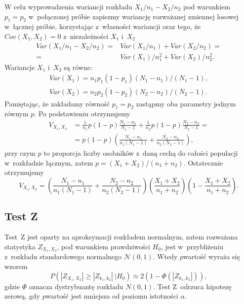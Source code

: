 W celu wyprowadzenia wariancji rozkładu $X_1/n_1-X_2/n_2$ pod warunkiem $p_1=p_2$ w~połączonej próbie zapiszmy wariancję rozważanej zmiennej losowej w~łącznej próbie, korzystając z~własności wariancji oraz tego, że $Cov(X_1,X_2)=0$ z~niezależności $X_1$ i~$X_2$
\begin{equation}
\begin{split}
Var(X_1/n_1-X_2/n_2)=&Var(X_1/n_1) + Var(X_2/n_2) =\\
 =& Var(X_1)/n_1^2+Var(X_2)/n_2^2.
\end{split}
\end{equation}
Wariancje $X_1$ i~$X_2$ są równe:
\begin{align}
Var(X_1)=n_1 p_1 (1-p_1)(N_1-n_1)/(N_1-1),\\
Var(X_2)=n_2 p_2 (1-p_2)(N_2-n_2)/(N_2-1).
\end{align}
Pamiętając, że zakładamy równość $p_1=p_2$ zastąpmy oba parametry jednym równym $p$. Po podstawieniu otrzymujemy
\begin{equation}
\begin{split}
V_{X_1,X_2} & = \frac{1}{n_1}p(1-p)\frac{N_1-n_1}{N_1-1} + \frac{1}{n_2}p(1-p)\frac{N_2-n_2}{N_2-1}= \\
&= p(1-p)\left(\frac{N_1-n_1}{n_1(N_1-1)}+\frac{N_2-n_2}{n_2(N_2-1)}\right),
\end{split}
\end{equation}
przy czym $p$ to proporcja liczby osobników z~daną cechą do całości populacji w~rozkładzie łącznym, zatem $p=(X_1+X_2)/(n_1+n_2)$. Ostatecznie otrzymujemy
\begin{equation}
V_{X_1,X_2} = \left(\frac{N_1-n_1}{n_1(N_1-1)}+\frac{N_2-n_2}{n_2(N_2-1)}\right)\left(\frac{X_1+X_2}{n_1+n_2}\right)\left(1-\frac{X_1+X_2}{n_1+n_2}\right).
\end{equation}

\subsection{Test Z}
\label{r2:testZ}
Test~Z jest oparty na aproksymacji rozkładem normalnym, zatem rozważana statystyka $Z_{X_1,X_2}$, pod warunkiem prawdziwości $H_0$, jest w~przybliżeniu z~rozkładu standardowego normalnego $\mathcal{N}(0,1)$. Wtedy $p$\dywiz wartość wyraża się wzorem
\begin{equation}
P(|Z_{X_1,X_2}|\geq|Z_{k_1,k_2}|\ |H_0) \approx 2(1-\Phi(|Z_{k_1,k_2}|)),
\end{equation}
gdzie $\Phi$ oznacza dystrybuantę rozkładu $N(0,1)$. Test Z~odrzuca hipotezę zerową, gdy $p$\dywiz wartość jest mniejsza od poziomu istotności $\alpha$.

